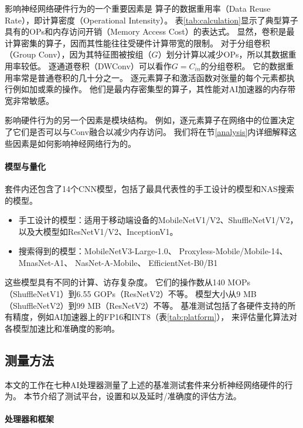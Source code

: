 
影响神经网络硬件行为的一个重要因素是
算子的数据重用率（Data Reuse Rate），即计算密度（Operational Intensity）。
表\ref{tab:calculation}显示了典型算子具有的OPs和内存访问开销（Memory Access Cost）的表达式。
显然，卷积是最计算密集的算子，因而其性能往往受硬件计算带宽的限制。
对于分组卷积（Group Conv），因为其特征图被按组（$G$）划分计算以减少OPs，所以其数据重用率较低。
逐通道卷积（DWConv）可以看作$G = C_{in}$的分组卷积。
它的数据重用率常是普通卷积的几十分之一。
逐元素算子和激活函数对张量的每个元素都执行例如加或乘的操作。
他们是最内存密集型的算子，其性能对AI加速器的内存带宽非常敏感。

影响硬件行为的另一个因素是模块结构。
例如，逐元素算子在网络中的位置决定了它们是否可以与Conv融合以减少内存访问。
我们将在节\ref{analysis}内详细解释这些因素是如何影响神经网络行为的。

\paragraph{模型与量化}
套件内还包含了14个CNN模型，包括了最具代表性的手工设计的模型和NAS搜索的模型。
\begin{itemize}
    \item 手工设计的模型：适用于移动端设备的MobileNetV1/V2、ShuffleNetV1/V2，
    以及大模型如ResNetV1/V2、InceptionV1\cite{szegedy2015going}。
    \item 搜索得到的模型：MobileNetV3-Large-1.0\cite{howard2019searching}、
    Proxyless-Mobile/Mobile-14\cite{cai2018proxylessnas}、
    MnasNet-A1\cite{tan2019mnasnet}、
    NasNet-A-Mobile\cite{zoph2018learning}、
    EfficientNet-B0/B1\cite{tan2019efficientnet}
\end{itemize}
这些模型具有不同的计算、访存复杂度。
它们的操作数从140 MOPs（ShuffleNetV1）到6.55 GOPs（ResNetV2）不等。
模型大小从9 MB（ShuffleNetV2）到99 MB（ResNetV2）不等。
基准测试包括了各硬件支持的所有精度，例如AI加速器上的FP16和INT8（表\ref{tab:platform}），
来评估量化算法对各模型加速比和准确度的影响。

\subsection{测量方法}
\label{measurement}
本文的工作在七种AI处理器测量了上述的基准测试套件来分析神经网络硬件的行为。
本节介绍了测试平台，设置和以及延时/准确度的评估方法。

\paragraph{处理器和框架}

